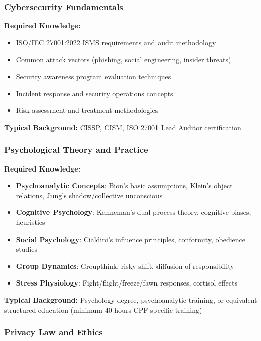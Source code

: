 \documentclass[11pt,a4paper]{article}
\begin{document}
\subsubsection{Cybersecurity Fundamentals}

\textbf{Required Knowledge:}
\begin{itemize}
\item ISO/IEC 27001:2022 ISMS requirements and audit methodology
\item Common attack vectors (phishing, social engineering, insider threats)
\item Security awareness program evaluation techniques
\item Incident response and security operations concepts
\item Risk assessment and treatment methodologies
\end{itemize}

\textbf{Typical Background:} CISSP, CISM, ISO 27001 Lead Auditor certification

\subsubsection{Psychological Theory and Practice}

\textbf{Required Knowledge:}
\begin{itemize}
\item \textbf{Psychoanalytic Concepts}: Bion's basic assumptions, Klein's object relations, Jung's shadow/collective unconscious
\item \textbf{Cognitive Psychology}: Kahneman's dual-process theory, cognitive biases, heuristics
\item \textbf{Social Psychology}: Cialdini's influence principles, conformity, obedience studies
\item \textbf{Group Dynamics}: Groupthink, risky shift, diffusion of responsibility
\item \textbf{Stress Physiology}: Fight/flight/freeze/fawn responses, cortisol effects
\end{itemize}

\textbf{Typical Background:} Psychology degree, psychoanalytic training, or equivalent structured education (minimum 40 hours CPF-specific training)

\subsubsection{Privacy Law and Ethics}
\end{document}
